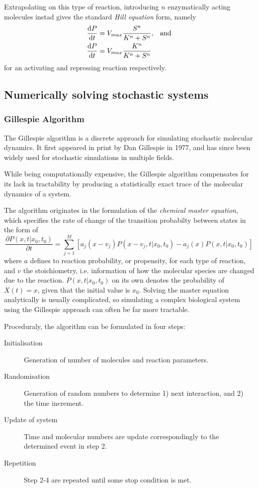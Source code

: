 Extrapolating on this type of reaction, introducing $n$ enzymatically acting
molecules instad gives the standard \textit{Hill equation} form, namely
\begin{align}
  \frac{\dd P}{\dd t} &= V_{max} \frac{S^n}{K^n + S^n},\hspace{.8em} \text{and} \\
  \frac{\dd P}{\dd t} &= V_{max} \frac{K^n}{K^n + S^n}
  \label{eq:hill}
\end{align}
for an activating and repressing reaction respectively.

\subsection[Stochastic Simulations]{Numerically solving stochastic systems}
\subsubsection{Gillespie Algorithm}
The Gillespie algorithm is a discrete approach for simulating stochastic
molecular dynamics. It first appeared in print by Dan Gillespie in 1977, and has
since been widely used for stochastic simulations in multiple fields.

While being computationally expensive, the Gillespie algorithm compensates for
its lack in tractability by producing a statistically exact trace of the
molecular dynamics of a system. 

The algorithm originates in the formulation of the \textit{chemical master equation},
which specifies the rate of change of the transition probabilty between states
in the form of 
\begin{equation}
  \dfrac{\partial P\left( x,t | x_0, t_0 \right)}{\partial t} = 
  \sum_{j =
    1}^{M} \left[ a_j\left( x-v_j \right)P\left( x-v_j, t|x_0,t_0 \right) -
    a_j(x)P\left( x,t|x_0,t_0 \right) \right]
\end{equation}
where $a$ defines to reaction probability, or propensity, for each type of reaction, and
$v$ the stoichiometry, i.e. information of how the molecular species are changed
due to the reaction. $P(x,t | x_0, t_0)$ on its own denotes the probability of
$X(t) = x$, given that the initial value is $x_0$. Solving the master equation
analytically is usually complicated, so  
simulating a complex biological system using the Gillespie approach can often be
far more tractable.

Proceduraly, the algorithm can be formulated in four steps: 
\begin{description}
  \item[Initialisation] Generation of number of molecules and reaction
    parameters. 
  \item[Randomisation] Generation of random numbers to determine 1) next
    interaction, and 2) the time increment.
  \item[Update of system] Time and molecular numbers are update correspondingly
    to the determined event in step 2.
  \item[Repetition] Step 2-4 are repeated until some stop condition is met.
\end{description}

